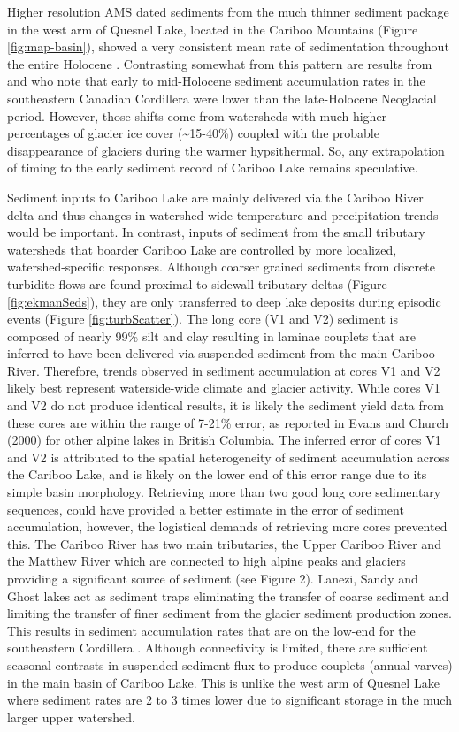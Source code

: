 \documentclass[Royal,times,doublespace,sageh]{sagej}
\begin{document}
Higher resolution AMS dated sediments from the much thinner sediment
package in the west arm of Quesnel Lake, located in the Cariboo
Mountains (Figure \ref{fig:map-basin}), showed a very consistent mean
rate of sedimentation throughout the entire Holocene
\citep{Gilbert2012}. Contrasting somewhat from this pattern are results
from \citet{Menounos2009b} and \citet{Desloges1999} who note that early
to mid-Holocene sediment accumulation rates in the southeastern Canadian
Cordillera were lower than the late-Holocene Neoglacial period. However,
those shifts come from watersheds with much higher percentages of
glacier ice cover (\textasciitilde15-40\%) coupled with the probable
disappearance of glaciers during the warmer hypsithermal. So, any
extrapolation of timing to the early sediment record of Cariboo Lake
remains speculative.

Sediment inputs to Cariboo Lake are mainly delivered via the Cariboo
River delta and thus changes in watershed-wide temperature and
precipitation trends would be important. In contrast, inputs of sediment
from the small tributary watersheds that boarder Cariboo Lake are
controlled by more localized, watershed-specific responses. Although
coarser grained sediments from discrete turbidite flows are found
proximal to sidewall tributary deltas (Figure \ref{fig:ekmanSeds}), they
are only transferred to deep lake deposits during episodic events
(Figure \ref{fig:turbScatter}). The long core (V1 and V2) sediment is
composed of nearly 99\% silt and clay resulting in laminae couplets that
are inferred to have been delivered via suspended sediment from the main
Cariboo River. Therefore, trends observed in sediment accumulation at
cores V1 and V2 likely best represent waterside-wide climate and glacier
activity. While cores V1 and V2 do not produce identical results, it is
likely the sediment yield data from these cores are within the range of
7-21\% error, as reported in Evans and Church (2000) for other alpine
lakes in British Columbia. The inferred error of cores V1 and V2 is
attributed to the spatial heterogeneity of sediment accumulation across
the Cariboo Lake, and is likely on the lower end of this error range due
to its simple basin morphology. Retrieving more than two good long core
sedimentary sequences, could have provided a better estimate in the
error of sediment accumulation, however, the logistical demands of
retrieving more cores prevented this. The Cariboo River has two main
tributaries, the Upper Cariboo River and the Matthew River which are
connected to high alpine peaks and glaciers providing a significant
source of sediment (see Figure 2). Lanezi, Sandy and Ghost lakes act as
sediment traps eliminating the transfer of coarse sediment and limiting
the transfer of finer sediment from the glacier sediment production
zones. This results in sediment accumulation rates that are on the
low-end for the southeastern Cordillera \citep{Hodder2006b}. Although
connectivity is limited, there are sufficient seasonal contrasts in
suspended sediment flux to produce couplets (annual varves) in the main
basin of Cariboo Lake. This is unlike the west arm of Quesnel Lake where
sediment rates are 2 to 3 times lower due to significant storage in the
much larger upper watershed.
\end{document}
